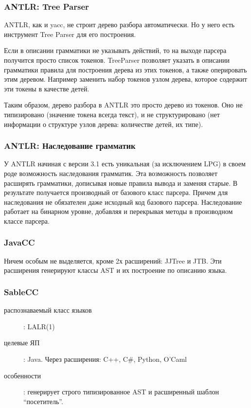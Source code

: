 \documentclass[a4paper,12pt,titlepage]{extarticle}
\begin{document}
\subsubsection*{ANTLR: Tree Parser}
ANTLR, как и yacc, не строит дерево разбора автоматически. Но у него есть
инструмент Tree Parser для его построения.

Если в описании грамматики не указывать действий, то на выходе парсера получится
просто список токенов. TreeParser позволяет указать в описании грамматики
правила для построения дерева из этих токенов, а также оперировать этим деревом.
Например заменить набор токенов узлом дерева, которое содержит эти токены в
качестве детей.

Таким образом, дерево разбора в ANTLR это просто дерево из токенов. Оно не
типизировано (значение токена всегда текст), и не структурировано (нет
информации о структуре узлов дерева: количестве детей, их типе).

\subsubsection*{ANTLR: Наследование грамматик}
У ANTLR начиная с версии 3.1 есть уникальная (за исключением LPG) в своем роде
возможность наследования грамматик. Эта возможность позволяет расширять
грамматики, дописывая новые правила вывода и заменяя старые. В результате
получается производный от базового класс парсера. Причем для наследования не
обязателен даже исходный код базового парсера. Наследование работает на
бинарном уровне, добавляя и перекрывая методы в производном классе парсера.

\subsubsection*{JavaCC}
Ничем особым не выделяется, кроме 2х расширений: JJTree и JTB. Эти расширения
генерируют классы AST и их построение по описанию языка.


\subsubsection*{SableCC}
\label{sablecc}
\begin{description}
  \item[распознаваемый класс языков]: LALR(1)
  \item[целевые ЯП]: Java. Через расширения: C++, C\#, Python, O'Caml
  \item[особенности]: генерирует строго типизированное AST и расширенный
 	шаблон ``посетитель''.
\end{description}
\end{document}
